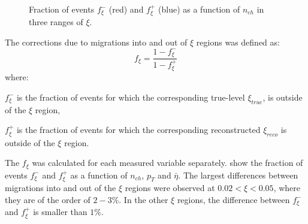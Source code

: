 \begin{figure}[h!]
\begin{subfigure}{.49\textwidth}
	\end{subfigure}
	\begin{minipage}{.49\textwidth}
		\caption[Fraction of events $f_{\xi}^-$ and $f_{\xi}^+$ as a function of $n_{ch}$ in three ranges of $\xi$]{Fraction of events $f_{\xi}^-$ (red) and $f_{\xi}^+$ (blue) as a function of $n_{ch}$ in three ranges of $\xi$.}
		\label{fig:xi_correction_nch}
	\end{minipage}
	
\end{figure}

The corrections due to migrations into and out of  $\xi$ regions was defined as:
 \begin{equation}
 f_{\xi} = \frac{1-f_{\xi}^-}{1-f_{\xi}^+}
 \end{equation}
 where:
 \begin{description}
 	\item $f_{\xi}^-$ is the fraction of events for which the corresponding true-level $\xi_{true}$, is outside of the $\xi$ region,
 	\item $f_{\xi}^+$  is the fraction of events for which the corresponding reconstructed $\xi_{reco}$ is outside of the $\xi$ region.
 \end{description}
 The $f_{\xi}$ was calculated for each measured variable separately.  show the fraction of events $f_{\xi}^-$ and $f_{\xi}^+$ as a function of $n_{ch}$, $p_T$ and $\bar{\eta}$. The largest differences between migrations into and out of the $\xi$ regions were observed at $0.02<\xi<0.05$, where they are of the order of $2-3\%$. In the other $\xi$ regions, the difference between $f_{\xi}^-$ and $f_{\xi}^+$  is smaller than $1\%$.
